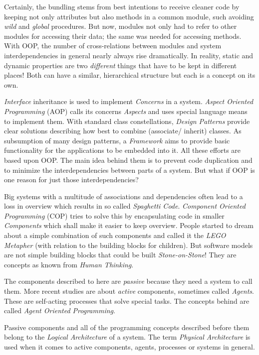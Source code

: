 Certainly, the bundling stems from best intentions to receive cleaner code by
keeping not only attributes but also methods in a common module, such avoiding
\emph{wild} and \emph{global} procedures. But now, modules not only had to refer
to other modules for accessing their data; the same was needed for accessing methods.
With OOP, the number of cross-relations between modules and system interdependencies
in general nearly always rise dramatically. In reality, static and dynamic
properties are two \emph{different} things that have to be kept in different
places! Both can have a similar, hierarchical structure but each is a concept on
its own.

\emph{Interface} inheritance is used to implement \emph{Concerns} in a system.
\emph{Aspect Oriented Programming} (AOP) calls its concerns \emph{Aspects} and
uses special language means to implement them. With standard class constellations,
\emph{Design Patterns} provide clear solutions describing how best to combine
(associate/ inherit) classes. As subsumption of many design patterns, a
\emph{Framework} aims to provide basic functionality for the applications to be
embedded into it. All these efforts are based upon OOP. The main idea behind them
is to prevent code duplication and to minimize the interdependencies between
parts of a system. But what if OOP is one reason for just those interdependencies?

Big systems with a multitude of associations and dependencies often lead to a
loss in overview which results in so called \emph{Spaghetti Code}.
\emph{Component Oriented Programming} (COP) tries to solve this by encapsulating
code in smaller \emph{Components} which shall make it easier to keep overview.
People started to dream about a simple combination of such components and called
it the \emph{LEGO Metapher} (with relation to the building blocks for children).
But software models are not simple building blocks that could be built
\emph{Stone-on-Stone}! They are concepts as known from \emph{Human Thinking}.

The components described to here are \emph{passive} because they need a system
to call them. More recent studies are about \emph{active} components, sometimes
called \emph{Agents}. These are self-acting processes that solve special tasks.
The concepts behind are called \emph{Agent Oriented Programming}.

Passive components and all of the programming concepts described before them
belong to the \emph{Logical Architecture} of a system. The term
\emph{Physical Architecture} is used when it comes to active components, agents,
processes or systems in general.
